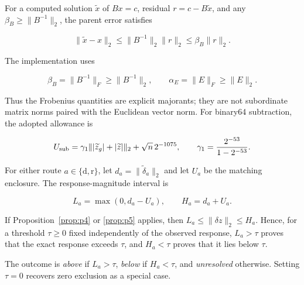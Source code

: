 For a computed solution $\widetilde x$ of $Bx=c$, residual
$r=c-B\widetilde x$, and any
$\beta_B\geq\lVert B^{-1}\rVert_2$, the parent error satisfies
\begin{linenomath*}
\begin{equation}
\lVert\widetilde x-x\rVert_2
\leq\lVert B^{-1}\rVert_2\lVert r\rVert_2
\leq\beta_B\lVert r\rVert_2.
\label{eq:parent_majorant}
\end{equation}
\end{linenomath*}
The implementation uses
\begin{linenomath*}
\begin{equation}
\beta_B=\lVert B^{-1}\rVert_F\geq\lVert B^{-1}\rVert_2,
\qquad
\alpha_E=\lVert E\rVert_F\geq\lVert E\rVert_2.
\label{eq:frobenius_majorants}
\end{equation}
\end{linenomath*}
Thus the Frobenius quantities are explicit majorants; they are not
subordinate matrix norms paired with the Euclidean vector norm.
For binary64 subtraction, the adopted allowance is
\begin{linenomath*}
\begin{equation}
U_{\rm sub}
=\gamma_1\lVert|\widetilde z_g|+|\widetilde z|\rVert_2
+\sqrt n\,2^{-1075},\qquad
\gamma_1=\frac{2^{-53}}{1-2^{-53}}.
\label{eq:subtraction_allowance}
\end{equation}
\end{linenomath*}

For either route $a\in\{\mathrm d,\mathrm r\}$, let
$d_a=\lVert\widetilde\delta_a\rVert_2$ and let $U_a$ be the matching
enclosure. The response-magnitude interval is
\begin{linenomath*}
\begin{equation}
L_a=\max(0,d_a-U_a),\qquad H_a=d_a+U_a.
\label{eq:response_magnitude_interval}
\end{equation}
\end{linenomath*}

\begin{corollary}
\label{cor:threshold}
If Proposition~\ref{prop:p4} or \ref{prop:p5} applies, then
$L_a\leq\lVert\delta z\rVert_2\leq H_a$. Hence, for a threshold
$\tau\geq0$ fixed independently of the observed response,
$L_a>\tau$ proves that the exact response exceeds $\tau$, and
$H_a<\tau$ proves that it lies below $\tau$.
\end{corollary}

\begin{definition}
The outcome is \emph{above} if $L_a>\tau$, \emph{below} if
$H_a<\tau$, and \emph{unresolved} otherwise. Setting $\tau=0$ recovers
zero exclusion as a special case.
\end{definition}


